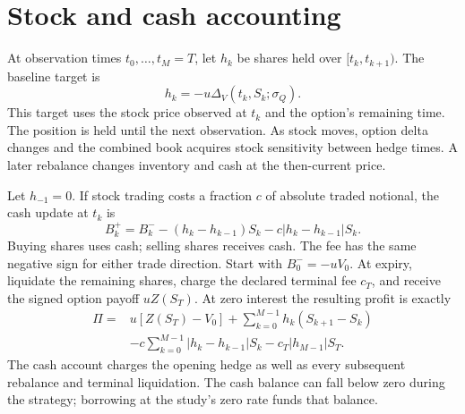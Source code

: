 \documentclass[8pt]{strategynet-journal}
\begin{document}
\begin{SNcolumns}
\begin{center}
\begin{minipage}{\linewidth}
\centering
{}
\end{minipage}
\end{center}

\section{Stock and cash accounting}
At observation times $t_0,\ldots, t_M=T $, let $h_k $ be shares held over
$[t_k, t_{k+1})$. The baseline target is
\begin{equation}
 h_k=-u\Delta_V(t_k, S_k;\sigma_Q).
 \label{eq:hedge}
\end{equation}
This target uses the stock price observed at $t_k $ and the option's remaining
time. The position is held until the next observation. As stock moves, option
delta changes and the combined book acquires stock sensitivity between hedge
times. A later rebalance changes inventory and cash at the then-current price.

Let $h_{-1}=0$. If stock trading costs a fraction $c $ of absolute traded notional,
the cash update at $t_k $ is
\begin{equation}
 B_k^+=B_k^--(h_k-h_{k-1})S_k-c|h_k-h_{k-1}|S_k.
 \label{eq:cash}
\end{equation}
Buying shares uses cash; selling shares receives cash. The fee has the same
negative sign for either trade direction. Start with $B_0^-=-uV_0$. At expiry,
liquidate the remaining shares, charge the declared terminal fee $c_T $, and
receive the signed option payoff $uZ(S_T)$. At zero interest the resulting profit
is exactly
\begin{align}
 \Pi={}&u[Z(S_T)-V_0]+\sum_{k=0}^{M-1}h_k(S_{k+1}-S_k)\nonumber\\
 &-c\sum_{k=0}^{M-1}|h_k-h_{k-1}|S_k-c_T|h_{M-1}|S_T.
 \label{eq:pnl}
\end{align}
The cash account charges the opening hedge as well as every subsequent rebalance and terminal
liquidation. The cash balance can fall below zero during the strategy; borrowing at the
study's zero rate funds that balance.


\end{SNcolumns}
\end{document}
